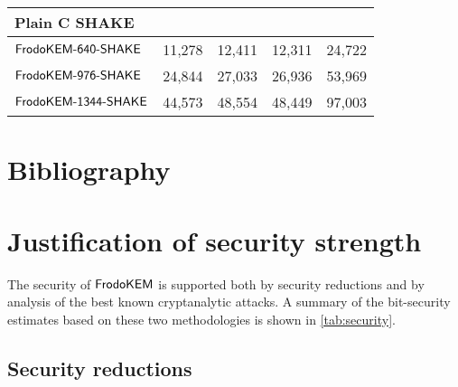 \documentclass{iacrcc}
\begin{document}
\begin{table}[t]
\begin{tabular}{l|c c c|c}
\midrule
\multicolumn{5}{l}{\bf Plain C SHAKE} \\
\midrule
$\textsf{\upshape\mdseries FrodoKEM-640-SHAKE}$                               &            11,278                &           12,411                   &               12,311       &               24,722             \\
$\textsf{\upshape\mdseries FrodoKEM-976-SHAKE}$                             &            24,844                &           27,033                   &               26,936       &               53,969             \\
$\textsf{\upshape\mdseries FrodoKEM-1344-SHAKE}$                             &            44,573                &            48,554                   &                48,449       &                97,003             \\
\bottomrule
\end{tabular}
\end{table}




\section{Bibliography}





\appendix

\section{Justification of security strength}
\label{sec:strength:justification}

The security of $\textsf{\upshape\mdseries FrodoKEM}$ is supported both by security reductions
and by analysis of the best known cryptanalytic attacks.  A summary of the bit-security estimates based on these two methodologies is shown in \autoref{tab:security}.

\subsection{Security reductions}
\label{sec:strength:reductions}
\end{document}
